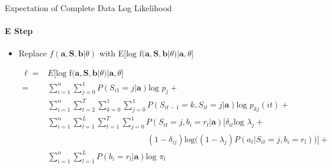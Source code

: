 \documentclass{beamer}
\begin{document}
\begin{frame}[shrink=5]{Expectation of Complete Data Log Likelihood}
\framesubtitle{E Step}

\begin{itemize}
    \item Replace $f(\textbf{a},\textbf{S}, \textbf{b} | \theta)$ with E$\big[\text{log f}(\textbf{a},\textbf{S}, \textbf{b} | \theta) | \textbf{a},\theta\big]$ \bigskip
    \begin{adjustwidth}{-3.5em}{-3em}
    $\begin{aligned}
        \ell = & E\big[\text{log f}(\textbf{a},\textbf{S}, \textbf{b} | \theta) | \textbf{a},\theta\big]\\
    = & \sum_{i=1}^n\sum_{j=0}^1P(S_{i1}=j|\textbf{a})\text{log }p_j + \\
    & \sum_{i=1}^n \sum^T_{t=2} \sum_{k=0}^1 \sum_{j=0}^1 
        P(S_{it-1}=k,S_{it}=j|\textbf{a})\text{log }p_{kj}(it) + \\ 
    & \sum_{i=1}^n \sum_{l=1}^L \sum^T_{t=1}\sum_{j=0}^1 P(S_{it}=j,b_i=r_l|\textbf{a}) \biggr[\delta_{it}\text{log }\lambda_j +  \\
    & \phantom{\sum_{i=1}^n \sum^T_{t=2} \sum_{k=0}^1 \sum_{j=0}^1} 
    (1-\delta_{ij})\text{log}\Big((1-\lambda_j)P(a_{t}|S_{it}=j, b_i=r_l) \Big)\biggr]+ \\
    &  \sum_{i=1}^n \sum_{l=1}^L P(b_i=r_l|\textbf{a}) \text{log }\pi_l  
    \end{aligned}$
    \end{adjustwidth}



\end{itemize}

\end{frame}




\end{document}
